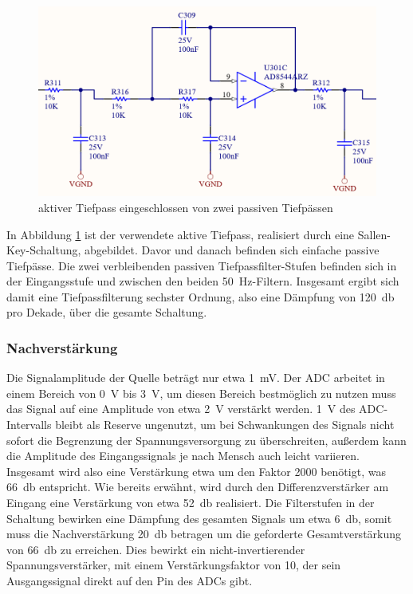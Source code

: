\begin{figure} [!h]
	\includegraphics[width=\textwidth] {EKG_aktiver_Tiefpassfilter.png}
	\caption{aktiver Tiefpass eingeschlossen von zwei passiven Tiefpässen}
	\label{aktiver Tiefpass} 
\end{figure}

In Abbildung \ref{aktiver Tiefpass} ist der verwendete aktive Tiefpass, realisiert durch eine Sallen-Key-Schaltung, abgebildet. Davor und danach befinden sich einfache passive Tiefpässe. Die zwei verbleibenden passiven Tiefpassfilter-Stufen befinden sich in der Eingangsstufe und zwischen den beiden \SI{50}{\hertz}-Filtern. Insgesamt ergibt sich damit eine Tiefpassfilterung sechster Ordnung, also eine Dämpfung von \SI{120}{\decibel} pro Dekade, über die gesamte Schaltung. 

\subsubsection{Nachverstärkung}

Die Signalamplitude der Quelle beträgt nur etwa \SI{1}{\milli\volt}. Der ADC arbeitet in einem Bereich von \SI{0}{\volt} bis \SI{3}{\volt}, um diesen Bereich bestmöglich zu nutzen muss das Signal auf eine Amplitude von etwa \SI{2}{\volt} verstärkt werden. \SI{1}{\volt} des ADC-Intervalls bleibt als Reserve ungenutzt, um bei Schwankungen des Signals nicht sofort die Begrenzung der Spannungsversorgung zu überschreiten, außerdem kann die Amplitude des Eingangssignals je nach Mensch auch leicht variieren. Insgesamt wird also eine Verstärkung etwa um den Faktor 2000 benötigt, was \SI{66}{\decibel} entspricht. Wie bereits erwähnt, wird durch den Differenzverstärker am Eingang eine Verstärkung von etwa \SI{52}{\decibel} realisiert. Die Filterstufen in der Schaltung bewirken eine Dämpfung des gesamten Signals um etwa \SI{6}{\decibel}, somit muss die Nachverstärkung \SI{20}{\decibel} betragen um die geforderte Gesamtverstärkung von \SI{66}{\decibel} zu erreichen. Dies bewirkt ein nicht-invertierender Spannungsverstärker, mit einem Verstärkungsfaktor von 10, der sein Ausgangssignal direkt auf den Pin des ADCs gibt.

